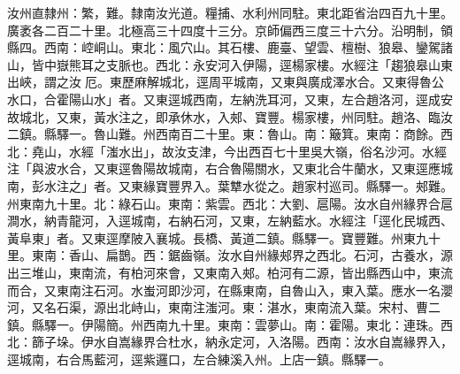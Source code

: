 \begin{pinyinscope}
汝州直隸州：繁，難。隸南汝光道。糧捕、水利州同駐。東北距省治四百九十里。廣袤各二百二十里。北極高三十四度十三分。京師偏西三度三十六分。沿明制，領縣四。西南：崆峒山。東北：風穴山。其石樓、鹿臺、望雲、檀樹、狼皋、鑾駕諸山，皆中嶽熊耳之支脈也。西北：永安河入伊陽，逕楊家樓。水經注「趨狼皋山東出峽，謂之汝厄。東歷麻解城北，逕周平城南，又東與廣成澤水合。又東得魯公水口，合霍陽山水」者。又東逕城西南，左納洗耳河，又東，左合趙洛河，逕成安故城北，又東，黃水注之，即承休水，入郟、寶豐。楊家樓，州同駐。趙洛、臨汝二鎮。縣驛一。魯山難。州西南百二十里。東：魯山。南：簸箕。東南：商餘。西北：堯山，水經「滍水出」，故汝支津，今出西百七十里吳大嶺，俗名沙河。水經注「與波水合，又東逕魯陽故城南，右合魯陽關水，又東北合牛蘭水，又東逕應城南，彭水注之」者。又東緣寶豐界入。葉犨水從之。趙家村巡司。縣驛一。郟難。州東南九十里。北：綠石山。東南：紫雲。西北：大劉、扈陽。汝水自州緣界合扈澗水，納青龍河，入逕城南，右納石河，又東，左納藍水。水經注「逕化民城西、黃阜東」者。又東逕摩陂入襄城。長橋、黃道二鎮。縣驛一。寶豐難。州東九十里。東南：香山、扁鵲。西：鋸齒嶺。汝水自州緣郟界之西北。石河，古養水，源出三堆山，東南流，有柏河來會，又東南入郟。柏河有二源，皆出縣西山中，東流而合，又東南注石河。水蚩河即沙河，在縣東南，自魯山入，東入葉。應水一名瀴河，又名石渠，源出北峙山，東南注滍河。東：湛水，東南流入葉。宋村、曹二鎮。縣驛一。伊陽簡。州西南九十里。東南：雲夢山。南：霍陽。東北：連珠。西北：篩子垛。伊水自嵩緣界合杜水，納永定河，入洛陽。西南：汝水自嵩緣界入，逕城南，右合馬藍河，逕紫邏口，左合練溪入州。上店一鎮。縣驛一。


\end{pinyinscope}
